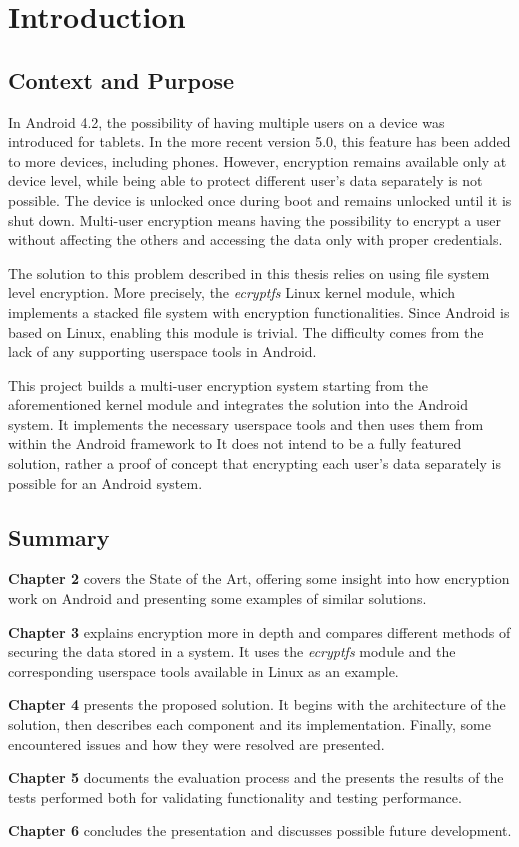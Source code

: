 \chapter{Introduction}
\label{chapter:intro}

\section{Context and Purpose}
\label{sec:ctx-purpose-intro}

In Android 4.2, the possibility of having multiple users on a device was introduced for tablets\cite{and-42}. In the more recent version 5.0, this feature has been added to more devices, including phones\cite{and-50}. However, encryption remains available only at device level, while being able to protect different user's data separately is not possible. The device is unlocked once during boot and remains unlocked until it is shut down. Multi-user encryption means having the possibility to encrypt a user without affecting the others and accessing the data only with proper credentials.

The solution to this problem described in this thesis relies on using file system level encryption. More precisely, the \textit{ecryptfs} Linux kernel module, which implements a stacked file system with encryption functionalities. Since Android is based on Linux, enabling this module is trivial. The difficulty comes from the lack of any supporting userspace tools in Android.

This project builds a multi-user encryption system starting from the aforementioned kernel module and integrates the solution into the Android system. It implements the necessary userspace tools and then uses them from within the Android framework to It does not intend to be a fully featured solution, rather a proof of concept that encrypting each user's data separately is possible for an Android system.

\section{Summary}
\label{sec:summ-intro}

\textbf{Chapter 2} covers the State of the Art, offering some insight into how encryption work on Android and presenting some examples of similar solutions.

\textbf{Chapter 3} explains encryption more in depth and compares different methods of securing the data stored in a system. It uses the \textit{ecryptfs} module and the corresponding userspace tools available in Linux as an example.

\textbf{Chapter 4} presents the proposed solution. It begins with the architecture of the solution, then describes each component and its implementation. Finally, some encountered issues and how they were resolved are presented.

\textbf{Chapter 5} documents the evaluation process and the presents the results of the tests performed both for validating functionality and testing performance.

\textbf{Chapter 6} concludes the presentation and discusses possible future development.
